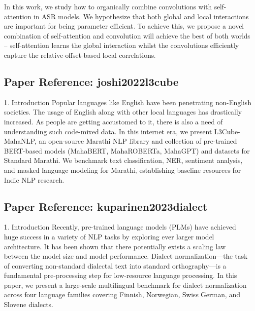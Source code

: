 \documentclass[11pt,a4paper]{article}
\begin{document}
In this work, we study how to organically combine convolutions with self-attention in ASR models. We hypothesize that both global and local interactions are important for being parameter efficient. To achieve this, we propose a novel combination of self-attention and convolution will achieve the best of both worlds – self-attention learns the global interaction whilst the convolutions efficiently capture the relative-offset-based local correlations.

\vspace{18pt}


\subsection*{Paper Reference: joshi2022l3cube}

1. Introduction Popular languages like English have been penetrating non-English societies. The usage of English along with other local languages has drastically increased. As people are getting accustomed to it, there is also a need of understanding such code-mixed data. In this internet era, we present L3Cube-MahaNLP, an open-source Marathi NLP library and collection of pre-trained BERT-based models (MahaBERT, MahaROBERTa, MahaGPT) and datasets for Standard Marathi. We benchmark text classification, NER, sentiment analysis, and masked language modeling for Marathi, establishing baseline resources for Indic NLP research.

\vspace{18pt}


\subsection*{Paper Reference: kuparinen2023dialect}

1. Introduction Recently, pre-trained language models (PLMs) have achieved huge success in a variety of NLP tasks by exploring ever larger model architecture. It has been shown that there potentially exists a scaling law between the model size and model performance. Dialect normalization—the task of converting non-standard dialectal text into standard orthography—is a fundamental pre-processing step for low-resource language processing. In this paper, we present a large-scale multilingual benchmark for dialect normalization across four language families covering Finnish, Norwegian, Swiss German, and Slovene dialects.
\end{document}
